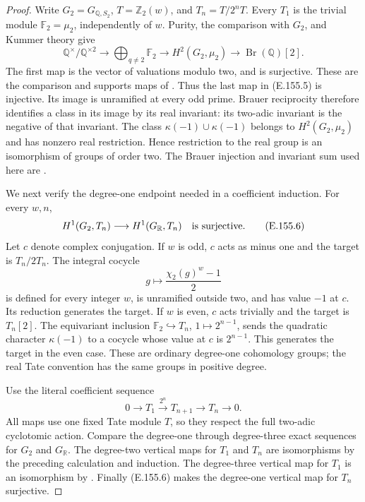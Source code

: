 \begin{proof}
Write \(G_2=G_{\mathbb Q,S_2}\), \(T=\mathbb Z_2(w)\), and
\(T_n=T/2^nT\). Every \(T_1\) is the trivial module
\(\mathbb F_2=\mu_2\), independently of \(w\).
Purity, the comparison with \(G_2\), and Kummer theory give
\[
 \mathbb Q^\times/\mathbb Q^{\times2}
 \longrightarrow\bigoplus_{q\ne2}\mathbb F_2
 \longrightarrow H^2(G_2,\mu_2)
 \longrightarrow\operatorname{Br}(\mathbb Q)[2].
 \tag{E.155.5}
\]
The first map is the vector of valuations modulo two, and is
surjective. These are the comparison and supports maps of
\citet[II.2.9, pp.~170--171; II.1.7(b), pp.~151--152]{CohMilneADT}.
Thus the last map in (E.155.5) is injective. Its image is
unramified at every odd prime. Brauer reciprocity therefore
identifies a class in its image by its real invariant: its
two-adic invariant is the negative of that invariant.
The class \(\kappa(-1)\cup\kappa(-1)\) belongs to
\(H^2(G_2,\mu_2)\) and has nonzero real restriction.
Hence restriction to the real group is an isomorphism of
groups of order two. The Brauer injection and invariant sum
used here are \citet[II.2.1--2.2, pp.~163--165]{CohMilneADT}.

We next verify the degree-one endpoint needed in a coefficient
induction. For every \(w,n\),
\[
             H^1(G_2,T_n)\longrightarrow H^1(G_{\mathbb R},T_n)
             \quad\hbox{is surjective}.
 \tag{E.155.6}
\]
Let \(c\) denote complex conjugation. If \(w\) is odd,
\(c\) acts as minus one and the target is \(T_n/2T_n\).
The integral cocycle
\[
                  g\longmapsto\frac{\chi_2(g)^w-1}{2}
 \tag{E.155.7}
\]
is defined for every integer \(w\), is unramified outside two,
and has value \(-1\) at \(c\). Its reduction generates the
target. If \(w\) is even, \(c\) acts trivially and the target
is \(T_n[2]\). The equivariant inclusion
\(\mathbb F_2\hookrightarrow T_n\), \(1\mapsto2^{n-1}\),
sends the quadratic character \(\kappa(-1)\) to a cocycle
whose value at \(c\) is \(2^{n-1}\). This generates the
target in the even case. These are ordinary degree-one
cohomology groups; the real Tate convention has the same
groups in positive degree.

Use the literal coefficient sequence
\[
 0\longrightarrow T_1
 \xrightarrow{\,2^n\,}T_{n+1}
 \longrightarrow T_n\longrightarrow0.
 \tag{E.155.8}
\]
All maps use one fixed Tate module \(T\), so they respect
the full two-adic cyclotomic action. Compare the degree-one
through degree-three exact sequences for \(G_2\) and
\(G_{\mathbb R}\). The degree-two vertical maps for \(T_1\)
and \(T_n\) are isomorphisms by the preceding calculation
and induction. The degree-three vertical map for \(T_1\)
is an isomorphism by
\citet[I.4.10(c), p.~57]{CohMilneADT}.
Finally (E.155.6) makes the degree-one vertical map for
\(T_n\) surjective.


\end{proof}
